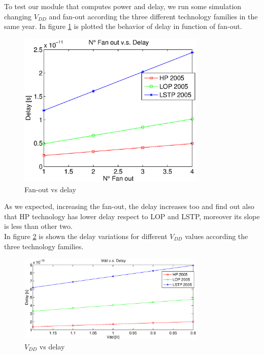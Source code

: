 To test our module that computes power and delay, we run some simulation changing $V_{DD}$ and fan-out according the three different technology families in the same year. In figure \ref{fig:fan-out_plot} is plotted the behavior of delay in function of fan-out.
\begin{figure}[htbp]
\begin{center}
\includegraphics[width=0.8\textwidth]{img/plot_fanout_delay.eps}
\caption{Fan-out vs delay}
\label{fig:fan-out_plot}
\end{center}
\end{figure}
As we expected, increasing the fan-out, the delay increases too and find out also that HP technology has lower delay respect to LOP and LSTP, moreover its slope is less than other two. \\In figure \ref{fig:vdd_plot} is shown the delay variations for different $V_{DD}$ values according the three technology families.
\begin{figure}[htbp]
\begin{center}
\includegraphics[width=0.8\textwidth]{img/plot_vdd_delay.eps}
\caption{$V_{DD}$ vs delay}
\label{fig:vdd_plot}
\end{center}
\end{figure}
